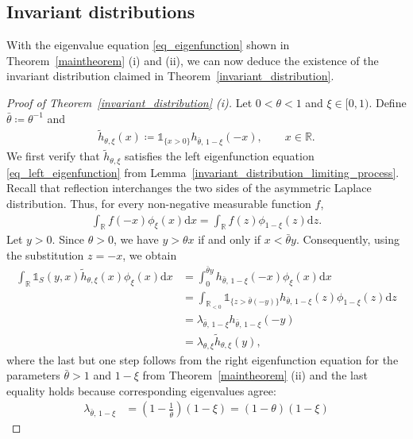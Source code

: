 \documentclass[12pt]{article}
\newcommand{\R}{\mathbb{R}} %
\newcommand{\1}{\mathds{1}}
\renewcommand{\d}{\mathrm{d}}
\theoremstyle{definition}
\theoremstyle{plain}
\theoremstyle{remark}
\begin{document}
\subsection{Invariant distributions}\label{invariant distributions}
With the eigenvalue equation \eqref{eq_eigenfunction} shown in Theorem~\ref{maintheorem} (i) and (ii), we can now deduce the existence of the invariant distribution claimed in Theorem~\ref{invariant_distribution}.
\begin{proof}[Proof of Theorem~\ref{invariant_distribution} (i)]
Let $0<\theta<1$ and $\xi\in[0,1)$. Define $\bar\theta\coloneqq \theta^{-1}$ and
\begin{align*} 
    \tilde h_{\theta,\xi}(x) \coloneqq \mathds{1}_{\{x>0\}} h_{\bar\theta,\,1-\xi}(-x), \qquad x\in\R. 
\end{align*} 
We first verify that $\tilde h_{\theta,\xi}$ satisfies the left eigenfunction equation \eqref{eq_left_eigenfunction} from Lemma~\ref{invariant_distribution_limiting_process}. Recall that reflection interchanges the two sides of the asymmetric Laplace distribution. Thus, for every non-negative measurable function $f$, 
\begin{align*}
    \int_\R f(-x)\phi_\xi( x)\d x = \int_\R f(z)\phi_{1-\xi}( z)\d z. 
\end{align*} 
Let $y>0$. Since $\theta>0$, we have $y>\theta x $ if and only if $x<\bar\theta y$. 
Consequently, using the substitution $z=-x$, we obtain
 \begin{align*} 
    \int_\R \mathds{1}_S(y,x) \tilde h_{\theta,\xi}(x) \phi_\xi( x)\d x 
     &= \int_0^{\bar\theta y} h_{\bar\theta,\,1-\xi}(-x) \phi_\xi( x)\d x 
    \\ &= \int_{\R_{<0}} \mathds{1}_{\{z>\bar\theta(-y)\}} h_{\bar\theta,\,1-\xi}(z) \phi_{1-\xi}( z)\d z 
    \\ &= \lambda_{\bar\theta,\,1-\xi} h_{\bar\theta,\,1-\xi}(-y)
    \\ &= \lambda_{\theta,\xi} \tilde h_{\theta,\xi}(y), 
\end{align*}
where the last but one step follows from the right eigenfunction equation for the parameters $\bar\theta>1$ and $1-\xi$ from Theorem~\ref{maintheorem} (ii) and the last equality holds because corresponding eigenvalues agree:
\begin{align} 
    \lambda_{\bar\theta,\,1-\xi} 
    &= \left( 1-\frac{1}{\bar\theta} \right)(1-\xi) 
    = (1-\theta)(1-\xi) 

\end{align}
\end{proof}
\end{document}

